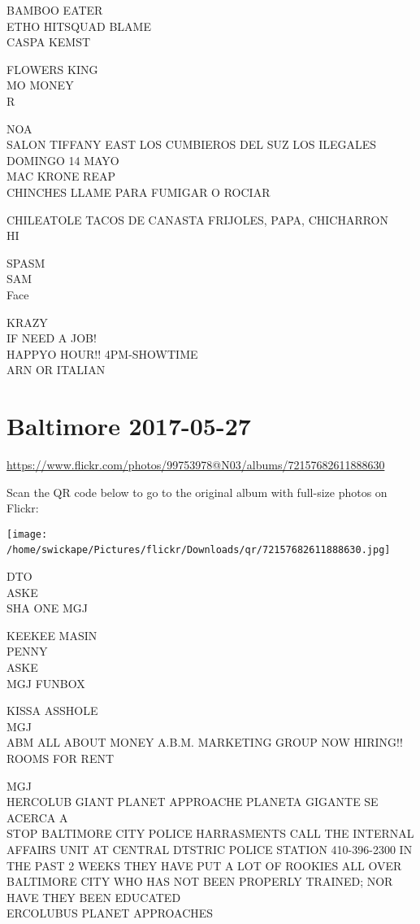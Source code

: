 \documentclass[10pt,letterpaper]{article}
\begin{document}
BAMBOO EATER\\
ETHO HITSQUAD BLAME\\
CASPA KEMST

FLOWERS KING\\
MO MONEY\\
R

NOA\\
SALON TIFFANY EAST LOS CUMBIEROS DEL SUZ LOS ILEGALES DOMINGO 14 MAYO\\
MAC KRONE REAP\\
CHINCHES LLAME PARA FUMIGAR O ROCIAR

CHILEATOLE TACOS DE CANASTA FRIJOLES, PAPA, CHICHARRON\\
HI

SPASM\\
SAM\\
Face

KRAZY\\
IF NEED A JOB!\\
HAPPYO HOUR!! 4PM{-}SHOWTIME\\
ARN OR ITALIAN
\

\section*{Baltimore 2017-05-27}

\url{https://www.flickr.com/photos/99753978@N03/albums/72157682611888630}

Scan the QR code below to go to the original album with full-size photos on Flickr:

\texttt{[image: /home/swickape/Pictures/flickr/Downloads/qr/72157682611888630.jpg]}
\

DTO\\
ASKE\\
SHA ONE MGJ

KEEKEE MASIN\\
PENNY\\
ASKE\\
MGJ FUNBOX

KISSA ASSHOLE\\
MGJ\\
ABM ALL ABOUT MONEY A.B.M. MARKETING GROUP NOW HIRING!!\\
ROOMS FOR RENT

MGJ\\
HERCOLUB GIANT PLANET APPROACHE PLANETA GIGANTE SE ACERCA A\\
STOP BALTIMORE CITY POLICE HARRASMENTS CALL THE INTERNAL AFFAIRS UNIT AT CENTRAL DTSTRIC POLICE STATION 410{-}396{-}2300 IN THE PAST 2 WEEKS THEY HAVE PUT A LOT OF ROOKIES ALL OVER BALTIMORE CITY WHO HAS NOT BEEN PROPERLY TRAINED; NOR HAVE THEY BEEN EDUCATED\\
ERCOLUBUS PLANET APPROACHES
\end{document}
